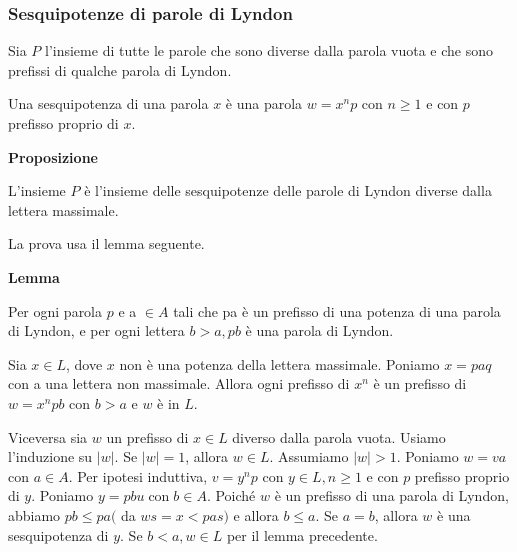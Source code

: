 \subsubsection{Sesquipotenze di parole di Lyndon}

Sia $P$ l'insieme di tutte le parole che sono diverse dalla parola vuota e che sono prefissi di qualche parola di Lyndon.

Una sesquipotenza di una parola $x$ è una parola $w=x^{n} p$ con $n \geq 1$ e con $p$ prefisso proprio di $x$.


\textbf{Proposizione}

L'insieme $P$ è l'insieme delle sesquipotenze delle parole di Lyndon diverse dalla lettera massimale.

\vspace{5mm}

La prova usa il lemma seguente.

\vspace{5mm}


\textbf{Lemma}

Per ogni parola $p$ e a $\in A$ tali che pa è un prefisso di una potenza di una parola di Lyndon, e per ogni lettera $b>a, p b$ è una parola di Lyndon.

\vspace{5mm}

Sia $x \in L$, dove $x$ non è una potenza della lettera massimale. Poniamo $x=p a q$ con a una lettera non massimale. Allora ogni prefisso di $x^{n}$ è un prefisso di $w=x^{n} p b$ con $b>a$ e $w$ è in $L$.

Viceversa sia $w$ un prefisso di $x \in L$ diverso dalla parola vuota. Usiamo l'induzione su $|w|$. Se $|w|=1$, allora $w \in L$. Assumiamo $|w|>1$. Poniamo $w=v a$ con $a \in A$. Per ipotesi induttiva, $v=y^{n} p$ con $y \in L, n \geq 1$ e con $p$ prefisso proprio di $y$. Poniamo $y=p b u \operatorname{con} b \in A$. Poiché $w$ è un prefisso di una parola di Lyndon, abbiamo $p b \leq p a($ da $w s=x<p a s)$ e allora $b \leq a$. Se $a=b$, allora $w$ è una sesquipotenza di $y .$ Se $b<a, w \in L$ per il lemma precedente.





\let\cleardoublepage\clearpage

